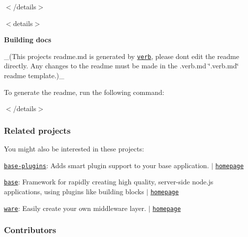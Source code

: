 $<$/details$>$

$<$details$>$ 

{\bfseries Building docs}

\+\_\+(This project\textquotesingle{}s readme.\+md is generated by \href{https://github.com/verbose/verb-generate-readme}{\tt verb}, please don\textquotesingle{}t edit the readme directly. Any changes to the readme must be made in the .verb.\+md \char`\"{}.\+verb.\+md\char`\"{} readme template.)\+\_\+

To generate the readme, run the following command\+:




$<$/details$>$

\subsubsection*{Related projects}

You might also be interested in these projects\+:


\begin{DoxyItemize}
\item \href{https://www.npmjs.com/package/base-plugins}{\tt base-\/plugins}\+: Adds \textquotesingle{}smart plugin\textquotesingle{} support to your base application. $\vert$ \href{https://github.com/node-base/base-plugins}{\tt homepage}
\item \href{https://www.npmjs.com/package/base}{\tt base}\+: Framework for rapidly creating high quality, server-\/side node.\+js applications, using plugins like building blocks $\vert$ \href{https://github.com/node-base/base}{\tt homepage}
\item \href{https://www.npmjs.com/package/ware}{\tt ware}\+: Easily create your own middleware layer. $\vert$ \href{https://github.com/segmentio/ware}{\tt homepage}
\end{DoxyItemize}

\subsubsection*{Contributors}

